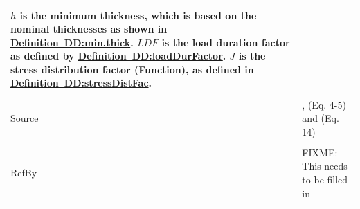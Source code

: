 \documentclass[12pt]{article}
\begin{document}
\begin{minipage}{\textwidth}
\begin{tabular}{p{} p{}}
        $h$ is the minimum thickness, which is based on the nominal thicknesses as shown in \hyperref[DD:min.thick]{Definition~DD:min.thick}.
        $LDF$ is the load duration factor as defined by \hyperref[DD:loadDurFactor]{Definition~DD:loadDurFactor}.
        $J$ is the stress distribution factor (Function), as defined in \hyperref[DD:stressDistFac]{Definition~DD:stressDistFac}.
\\ \midrule \\
Source & \cite{astm2009}, \cite{beasonEtAl1998} (Eq. 4-5) and \cite{campidelli} (Eq. 14)
\\ \midrule \\
RefBy & FIXME: This needs to be filled in
\\ \bottomrule \end{tabular}
\end{minipage}\\
~\newline
\end{document}
